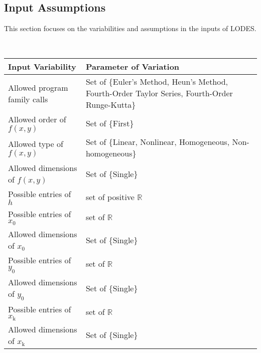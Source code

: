 \documentclass[12pt]{article}
\newcommand{\progname}{LODES} %
\begin{document}
\subsection{Input Assumptions} \label{Sec_ia}

This section focuses on the variabilities and assumptions in the inputs of \progname{}.

~\newline

\noindent
\begin{minipage}{\textwidth}
\renewcommand*{\arraystretch}{1.5}
\begin{tabular}{|p{}| p{}|}
  \hline
  \rowcolor[gray]{0.9}
  Input Variability& Parameter of Variation\\
  \hline
  Allowed program family calls & Set of \{Euler's Method, Heun's Method, Fourth-Order Taylor Series, Fourth-Order Runge-Kutta\}\\
  \hline
  Allowed order of $f(x,y)$ & Set of \{First\} \\
  \hline
  Allowed type of $f(x,y)$ & Set of \{Linear, Nonlinear, Homogeneous, Non-homogeneous\}\\
  \hline
  Allowed dimensions of $f(x,y)$ & Set of \{Single\}\\ 
  \hline
  Possible entries of $h$ & set of positive $\mathbb{R}$\\
  \hline
  Possible entries of $x_\text{0}$ & set of $\mathbb{R}$\\
  \hline
  Allowed dimensions of $x_\text{0}$ & Set of \{Single\}\\
  \hline
  Possible entries of $y_\text{0}$ & set of $\mathbb{R}$\\
  \hline
  Allowed dimensions of $y_\text{0}$ & Set of \{Single\}\\
  \hline
  Possible entries of $x_\text{k}$& set of $\mathbb{R}$\\
  \hline
  Allowed dimensions of $x_\text{k}$ & Set of \{Single\}\\
  \hline
\end{tabular}
\end{minipage}\\
\end{document}
